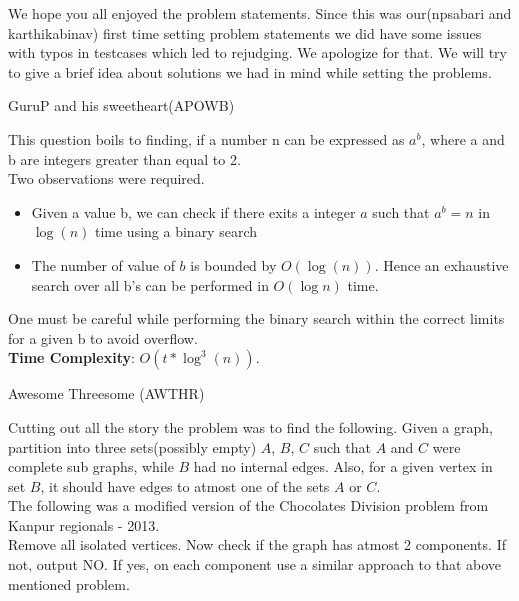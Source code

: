 \documentclass[solution,addpoints,12pt]{exam}
\begin{document}
\noindent
We hope you all enjoyed the problem statements. Since this was our(npsabari and karthikabinav) first time setting problem statements
we did have some issues with typos in testcases which led to rejudging. We apologize for that. We will try to give a brief idea about
solutions we had in mind while setting the problems. \\

\begin{questions}
\question
GuruP and his sweetheart(APOWB)

\begin{solution}
 This question boils to finding, if a number n can be expressed as $a^b$, where a and b are integers greater than equal to 2. \\
 Two observations were required.
 \begin{itemize}
  \item 
    Given a value b, we can check if there exits a integer $a$ such that $a^b = n$ in $\log (n)$ time using a binary search
  \item
    The number of value of $b$ is bounded by $O(\log (n))$. Hence an exhaustive search over all b's can be performed in $O(\log n)$ time.
 \end{itemize}
  One must be careful while performing the binary search within the correct limits for a given b to avoid overflow. \\
  
  \textbf{Time Complexity}: $O(t \ast \log^3(n))$.
 


\end{solution}

\question
  Awesome Threesome (AWTHR)

\begin{solution}
  Cutting out all the story the problem was to find the following. Given a graph, partition into three sets(possibly empty) $A$, $B$, $C$ such that
  $A$ and $C$ were complete sub graphs, while $B$ had no internal edges. Also, for a given vertex in set $B$, it should have edges to atmost one of 
  the sets $A$ or $C$. \\
  
  The following was a modified version of the Chocolates Division problem from Kanpur regionals - 2013. \\
  Remove all isolated vertices. Now check if the graph has atmost 2 components. If not, output NO. If yes,
  on each component use a similar approach to that above mentioned problem. \\
  

\end{solution}
\end{questions}
\end{document}
